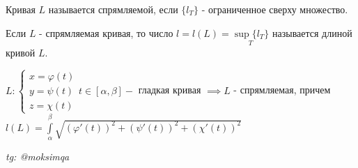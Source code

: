\documentclass[../main.tex]{subfiles}
\begin{document}
\begin{definition}
    Кривая $L $ называется спрямляемой, если $\{l_{T}\}$ - ограниченное сверху множество.
\end{definition}
\begin{definition}
    Если $L$ - спрямляемая кривая, то число $l=l(L)=\underset{T}{\sup{\{l_{T}\}}}$ называется длиной кривой $L$. 
\end{definition}
\begin{theorem}
    $L: \begin{cases}
        x=\varphi(t)\\ y=\psi(t)\\ z=\chi(t)
    \end{cases} t \in [\alpha,\beta] - $ гладкая кривая $\implies L$ - спрямляемая, причем\\ $l(L)=\int\limits_{\alpha}^{\beta}\sqrt{(\varphi'(t))^{2}+(\psi'(t))^{2}+(\chi'(t))^{2}} $ 
\end{theorem}
 



\vspace{1cm}
\begin{flushright}
    \textit{tg: @moksimqa}
\end{flushright}
\end{document}
